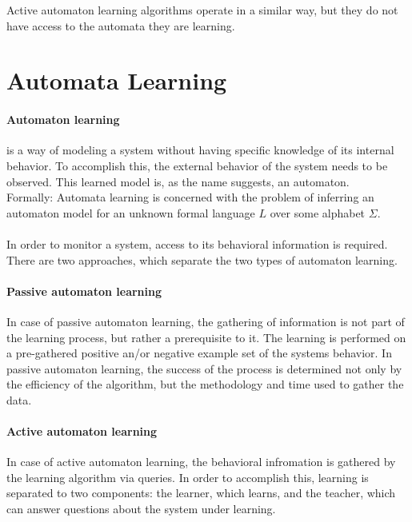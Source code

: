 Active automaton learning algorithms operate in a similar way, but they do not have access to the automata they are learning.

\section{Automata Learning} \label{sec_backgrautomatalearning}



\paragraph{Automaton learning}  is a way of modeling a system without having specific knowledge of its internal behavior. To accomplish this, the external behavior of the system needs to be observed. This learned model is, as the name suggests, an automaton. 
\\Formally: Automata  learning is  concerned  with  the  problem  of  inferring  an automaton model for an unknown formal language $L$ over some alphabet $\Sigma$\cite{Howar2018}.
\\\\In order to monitor a system, access to its behavioral information is required. There are two approaches, which separate the two types of automaton learning.

\paragraph{Passive automaton learning} In case of passive automaton learning, the gathering of information is not part of the learning process, but rather a prerequisite to it. The learning is performed on a pre-gathered positive an/or negative example set of the systems behavior. In passive automaton learning, the success of the process is determined not only by the efficiency of the algorithm, but the methodology and time used to gather the data.

\paragraph{Active automaton learning} In case of active automaton learning, the behavioral infromation is gathered by the learning algorithm via queries. In order to accomplish this, learning is separated to two components: the learner, which learns, and the teacher, which can answer questions about the system under learning.


